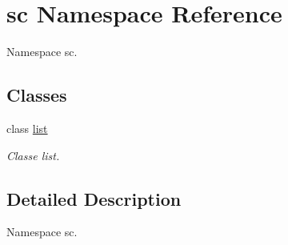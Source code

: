 \hypertarget{namespacesc}{}\section{sc Namespace Reference}
\label{namespacesc}


Namespace sc.  


\subsection*{Classes}
\begin{DoxyCompactItemize}
\item 
class \hyperlink{classsc_1_1list}{list}
\begin{DoxyCompactList}\small\item\em Classe list. \end{DoxyCompactList}\end{DoxyCompactItemize}


\subsection{Detailed Description}
Namespace sc. 